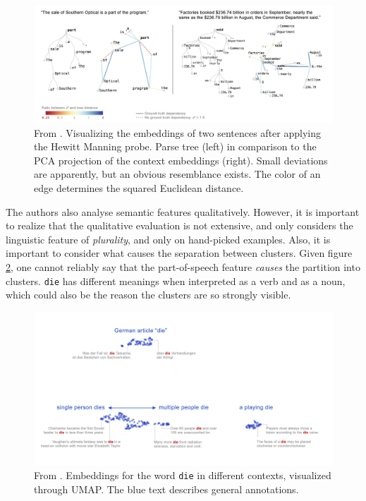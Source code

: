 \documentclass[a4paper,12pt,twoside,openright]{report}
\begin{document}
\begin{figure}
	\center
  \includegraphics[width=\linewidth]{./assets/relatedwork/BERT_tree.png}
  \caption{From \cite{coenen19}. Visualizing the embeddings of two sentences after applying the Hewitt Manning probe. Parse tree (left) in comparison to the PCA projection of the context embeddings (right). Small deviations are apparently, but an obvious resemblance exists. The color of an edge determines the squared Euclidean distance.}
  \label{fig:BERT_tree}
\end{figure}


The authors also analyse semantic features qualitatively.
However, it is important to realize that the qualitative evaluation is not extensive, and only considers the linguistic feature of \textit{plurality}, and only on hand-picked examples.
Also, it is important to consider what causes the separation between clusters.
Given figure \ref{fig:BERT_plurality}, one cannot reliably say that the part-of-speech feature \textit{causes} the partition into clusters.
\texttt{die} has different meanings when interpreted as a verb and as a noun, which could also be the reason the clusters are so strongly visible.

\begin{figure}
	\center
  \includegraphics[width=0.9\linewidth]{./assets/relatedwork/BERT_plurality.png}
  \caption{From \cite{coenen19}. Embeddings for the word \texttt{die} in different contexts, visualized through UMAP. The blue text describes general annotations.}
  \label{fig:BERT_plurality}
\end{figure}
\end{document}
